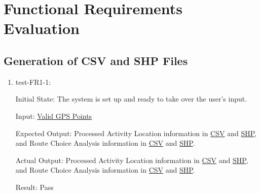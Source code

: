 \documentclass[12pt, titlepage]{article}
\begin{document}
\newpage


\section{Functional Requirements Evaluation}

\subsection{Generation of CSV and SHP Files}
\begin{enumerate}
    \item test-FR1-1:\label{test-FR1-1}
    
    Initial State: The system is set up and ready to take over the user’s input.
    
    Input: \href{https://github.com/paezha/PyERT-BLACK/blob/rev0-test/quarto-example/data/sample-gps/sample-gps-1.csv}{Valid GPS Points}
    
    Expected Output: Processed Activity Location information in \href{https://github.com/paezha/PyERT-BLACK/blob/rev0-test/test/test_data/fr-tests/fr1-1-expected-aloc.csv}{CSV} and \href{https://github.com/paezha/PyERT-BLACK/blob/rev0-test/test/test_data/fr-tests/fr1-1-expected-aloc.shp}{SHP}, and Route Choice Analysis information in \href{https://github.com/paezha/PyERT-BLACK/blob/rev0-test/test/test_data/fr-tests/fr1-1-expected-rca.csv}{CSV} and \href{https://github.com/paezha/PyERT-BLACK/blob/rev0-test/test/test_data/fr-tests/fr1-1-expected-rca.shp}{SHP}.
    
    Actual Output: Processed Activity Location information in \href{https://github.com/paezha/PyERT-BLACK/blob/rev0-test/test/test_data/fr-tests/fr1-1-out-aloc.csv}{CSV} and \href{https://github.com/paezha/PyERT-BLACK/blob/rev0-test/test/test_data/fr-tests/fr1-1-out-aloc.shp}{SHP}, and Route Choice Analysis information in \href{https://github.com/paezha/PyERT-BLACK/blob/rev0-test/test/test_data/fr-tests/fr1-1-out-rca.csv}{CSV} and \href{https://github.com/paezha/PyERT-BLACK/blob/rev0-test/test/test_data/fr-tests/fr1-1-out-rca.shp}{SHP}.
    
    Result: Pass
\end{enumerate}
\end{document}

